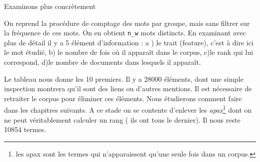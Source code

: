 \documentclass[
  letterpaper,
  DIV=11,
  numbers=noendperiod]{scrreprt}
\newenvironment{Shaded}{\begin{snugshade}}{\end{snugshade}}
\newcommand{\AttributeTok}[1]{\textcolor[rgb]{0.40,0.45,0.13}{#1}}
\newcommand{\CommentTok}[1]{\textcolor[rgb]{0.37,0.37,0.37}{#1}}
\newcommand{\ConstantTok}[1]{\textcolor[rgb]{0.56,0.35,0.01}{#1}}
\newcommand{\DecValTok}[1]{\textcolor[rgb]{0.68,0.00,0.00}{#1}}
\newcommand{\FunctionTok}[1]{\textcolor[rgb]{0.28,0.35,0.67}{#1}}
\newcommand{\NormalTok}[1]{\textcolor[rgb]{0.00,0.23,0.31}{#1}}
\newcommand{\OtherTok}[1]{\textcolor[rgb]{0.00,0.23,0.31}{#1}}
\newcommand{\SpecialCharTok}[1]{\textcolor[rgb]{0.37,0.37,0.37}{#1}}
\newcommand{\StringTok}[1]{\textcolor[rgb]{0.13,0.47,0.30}{#1}}
\begin{document}
Examinons plus concrètement

On reprend la procédure de comptage des mots par groupe, mais sans
filtrer sur la fréquence de ces mots. On en obtient \texttt{n\_w} mots
distincts. En examinant avec plus de détail il y a 5 élément
d'information : a ) le trait (feature), c'est à dire ici le mot étudié,
b) le nombre de fois où il apparaît dans le corpus, c)le rank qui lui
correspond, d)le nombre de documents dans lesquels il apparaît.

Le tableau nous donne les 10 premiers. Il y a 28000 éléments, dont une
simple inspection montrera qu'il sont des liens ou d'autres mentions. Il
est nécessaire de retraiter le corpus pour éliminer ces éléments. Nous
étudierons comment faire dans les chapitres suivants. A ce stade on se
contente d'enlever les \emph{apax}\footnote{les apax sont les termes qui
  n'apparaissent qu'une seule fois dans un corpus.} dont on ne peut
véritablement calculer un rang ( ils ont tous le dernier). Il nous reste
10854 termes.

\begin{Shaded}
\end{Shaded}
\end{document}
